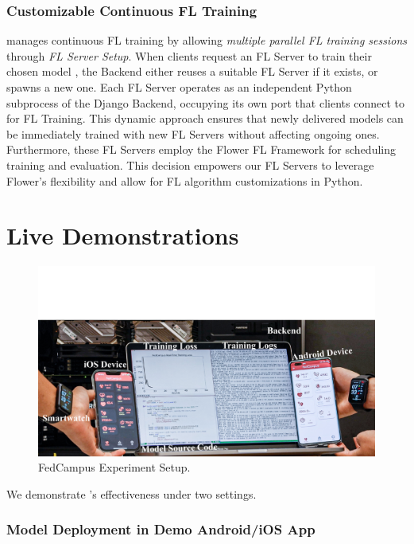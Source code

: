 \documentclass[conference]{IEEEtran}
\begin{document}
\subsubsection{Customizable Continuous FL Training}
\FedKit{} manages continuous FL training by allowing \textit{multiple parallel FL training sessions}
through \textit{FL Server Setup}.
When clients request an FL Server to
train their chosen model \model{},
the Backend either reuses a suitable FL Server \fs{} if it exists,
or spawns a new one.
Each FL Server
operates as an independent Python subprocess of the Django Backend,
occupying its own port that
clients connect to for FL Training.
This dynamic approach ensures that
newly delivered models can be immediately trained with new FL Servers
without affecting ongoing ones.
Furthermore,
these FL Servers employ the Flower FL Framework for
scheduling training and evaluation.
This decision empowers our FL Servers to leverage Flower's flexibility and
allow for FL algorithm customizations in Python.

\section{Live Demonstrations}

\begin{figure}
    \centering
    \includegraphics*[width=0.9\linewidth]{fedcampus.pdf}
    \caption{FedCampus Experiment Setup.}
    \label{fig:fedcampus}
\end{figure}

We demonstrate \FedKit{}'s effectiveness under two settings.

\subsubsection{Model Deployment in Demo Android/iOS App}
\end{document}

